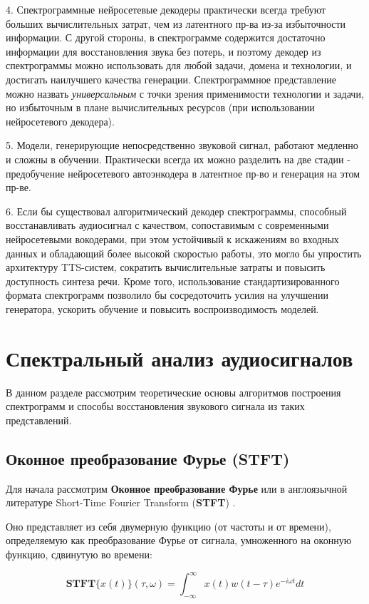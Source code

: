 4. Спектрограммные нейросетевые декодеры практически всегда требуют больших вычислительных затрат, чем из латентного пр-ва из-за избыточности информации. 
С другой стороны, в спектрограмме содержится достаточно информации для восстановления звука без потерь, 
и поэтому декодер из спектрограммы можно использовать для любой задачи, домена и технологии, и достигать наилучшего качества генерации.
Спектрограммное представление можно назвать \textit{универсальным} с точки зрения применимости технологии и задачи, но избыточным в плане вычислительных ресурсов 
(при использовании нейросетевого декодера).

5. Модели, генерирующие непосредственно звуковой сигнал, работают медленно и сложны в обучении. Практически всегда их можно разделить на две стадии - предобучение нейросетевого автоэнкодера в латентное пр-во и генерация на этом пр-ве.

6. Если бы существовал алгоритмический декодер спектрограммы, способный восстанавливать аудиосигнал с качеством, 
сопоставимым с современными нейросетевыми вокодерами, при этом устойчивый к искажениям во входных данных и обладающий более высокой скоростью работы, 
это могло бы упростить архитектуру TTS-систем, сократить вычислительные затраты и повысить доступность синтеза речи. 
Кроме того, использование стандартизированного формата спектрограмм позволило бы сосредоточить усилия на улучшении генератора, 
ускорить обучение и повысить воспроизводимость моделей.


\section{Спектральный анализ аудиосигналов}
В данном разделе рассмотрим теоретические основы алгоритмов построения спектрограмм и способы восстановления звукового сигнала из таких представлений.

\subsection{Оконное преобразование Фурье (STFT)}

Для начала рассмотрим \textbf{Оконное преобразование Фурье} или в англоязычной литературе Short-Time Fourier Transform (\textbf{STFT}) \cite{STFT}.

Оно представляет из себя двумерную функцию (от частоты и от времени), определяемую как преобразование Фурье от сигнала, умноженного на оконную функцию, сдвинутую во времени:

\begin{equation}
  \textbf{STFT}\{x(t)\} (\tau, \omega) = \int_{-\infty}^\infty x(t) w(t - \tau) e^{-i\omega t} dt
  \label{eq:stft_cont}
\end{equation}

